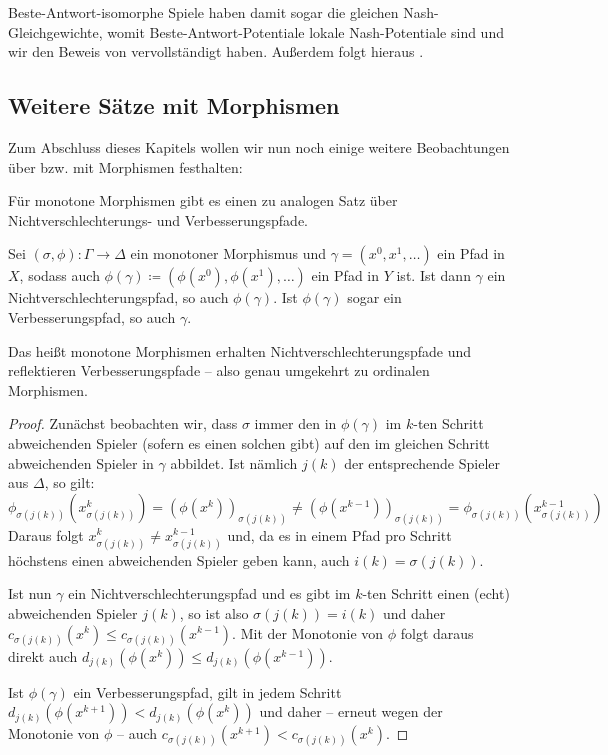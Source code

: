 Beste-Antwort-isomorphe Spiele haben damit sogar die gleichen Nash-Gleichgewichte, womit Beste-Antwort-Potentiale lokale Nash-Potentiale sind und wir den Beweis von  vervollständigt haben. Außerdem folgt hieraus .


\subsection{Weitere Sätze mit Morphismen}

Zum Abschluss dieses Kapitels wollen wir nun noch einige weitere Beobachtungen über bzw. mit Morphismen festhalten:

Für monotone Morphismen gibt es einen zu  analogen Satz über Nichtverschlechterungs- und Verbesserungspfade.

\begin{prop}
	Sei $(\sigma, \phi): \Gamma \to \Delta$ ein monotoner Morphismus und $\gamma = (x^0, x^1, \dots)$ ein Pfad in $X$, sodass auch $\phi(\gamma) \coloneqq (\phi(x^0), \phi(x^1), \dots)$ ein Pfad in $Y$ ist. Ist dann $\gamma$ ein Nichtverschlechterungspfad, so auch $\phi(\gamma)$. Ist $\phi(\gamma)$ sogar ein Verbesserungspfad, so auch $\gamma$.
\end{prop}

Das heißt monotone Morphismen erhalten Nichtverschlechterungspfade und reflektieren Verbesserungspfade -- also genau umgekehrt zu ordinalen Morphismen.

\begin{proof}
	Zunächst beobachten wir, dass $\sigma$ immer den in $\phi(\gamma)$ im $k$-ten Schritt abweichenden Spieler (sofern es einen solchen gibt) auf den im gleichen Schritt abweichenden Spieler in $\gamma$ abbildet. Ist nämlich $j(k)$ der entsprechende Spieler aus $\Delta$, so gilt:
	\[\phi_{\sigma(j(k))}\left(x_{\sigma(j(k))}^k\right) = \left(\phi(x^k)\right)_{\sigma(j(k))} \neq \left(\phi(x^{k-1})\right)_{\sigma(j(k))} = \phi_{\sigma(j(k))}\left(x_{\sigma(j(k))}^{k-1}\right)\]
	Daraus folgt $x_{\sigma(j(k))}^k \neq x_{\sigma(j(k))}^{k-1}$ und, da es in einem Pfad pro Schritt höchstens einen abweichenden Spieler geben kann, auch $i(k) = \sigma(j(k))$.
	
	Ist nun $\gamma$ ein Nichtverschlechterungspfad und es gibt im $k$-ten Schritt einen (echt) abweichenden Spieler $j(k)$, so ist also $\sigma(j(k)) = i(k)$ und daher $c_{\sigma(j(k))}(x^k) \leq c_{\sigma(j(k))}(x^{k-1})$. Mit der Monotonie von $\phi$ folgt daraus direkt auch $d_{j(k)}(\phi(x^k)) \leq d_{j(k)}(\phi(x^{k-1}))$.
	
	Ist $\phi(\gamma)$ ein Verbesserungspfad, gilt in jedem Schritt $d_{j(k)}(\phi(x^{k+1})) < d_{j(k)}(\phi(x^k))$ und daher -- erneut wegen der Monotonie von $\phi$ -- auch $c_{\sigma(j(k))}(x^{k+1}) < c_{\sigma(j(k))}(x^{k})$.
\end{proof}

